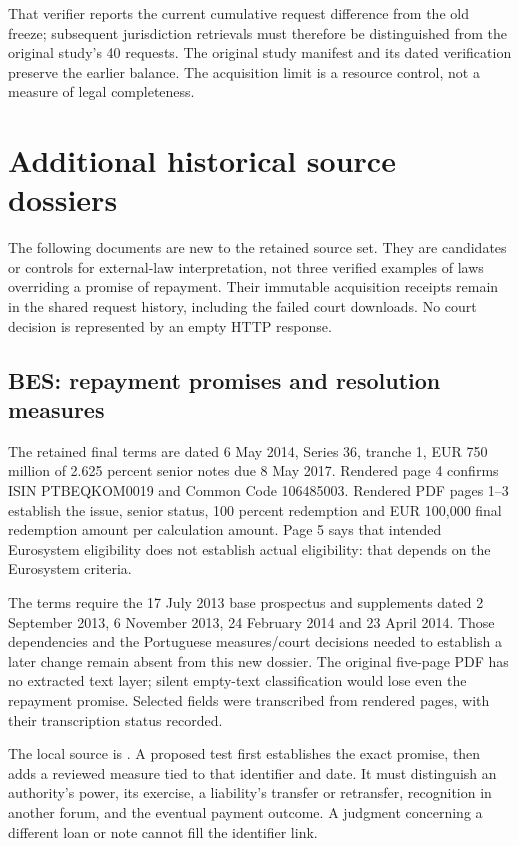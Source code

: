 That verifier reports the current cumulative request difference from the old
freeze; subsequent jurisdiction retrievals must therefore be distinguished
from the original study's 40 requests. The original study manifest and its
dated verification preserve the earlier balance. The acquisition limit is
a resource control, not a measure of legal completeness.


\section{Additional historical source dossiers}
\label{app:jurisdiction-candidates}

The following documents are new to the retained source set. They are
candidates or controls for external-law interpretation, not three verified
examples of laws overriding a promise of repayment. Their immutable acquisition
receipts remain in the shared request history, including the failed court
downloads. No court decision is represented by an empty HTTP response.

\subsection{BES: repayment promises and resolution measures}

The retained final terms are dated 6 May 2014, Series 36, tranche 1,
EUR 750 million of 2.625 percent senior notes due 8 May 2017. Rendered
page 4 confirms ISIN PTBEQKOM0019 and Common Code 106485003.
Rendered PDF pages 1--3 establish the issue, senior status, 100 percent
redemption and EUR 100,000 final redemption amount per calculation amount.
Page 5 says that intended Eurosystem eligibility does not establish actual
eligibility: that depends on the Eurosystem criteria.

The terms require the 17 July 2013 base prospectus and supplements dated
2 September 2013, 6 November 2013, 24 February 2014 and 23 April 2014.
Those dependencies and the Portuguese measures/court decisions needed to
establish a later change remain absent from this new dossier. The original
five-page PDF has no extracted text layer; silent empty-text classification
would lose even the repayment promise. Selected fields were transcribed
from rendered pages, with their transcription status recorded.

The local source is
.
A proposed test first establishes the exact promise, then adds a reviewed
measure tied to that identifier and date. It must distinguish an authority's
power, its exercise, a liability's transfer or retransfer, recognition in
another forum, and the eventual payment outcome. A judgment concerning a
different loan or note cannot fill the identifier link.

